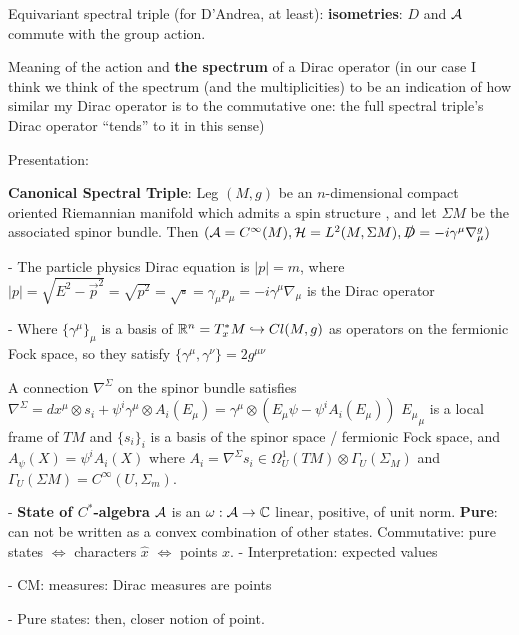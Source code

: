  Equivariant spectral triple (for D'Andrea, at least): \textbf{isometries}: $D$ and $\mathcal A$ commute with the group action.

Meaning of the action and \textbf{the spectrum} of a Dirac operator (in our case I think we think of the spectrum (and the multiplicities) to be an indication of how similar my Dirac operator is to the commutative one: the full spectral triple's Dirac operator ``tends'' to it in this sense)

Presentation:
    
    \textbf{Canonical Spectral Triple}: Leg $(M, g)$ be an $n$-dimensional compact oriented Riemannian manifold which admits a spin structure%
    , and let $\Sigma M$ %
    be the associated spinor bundle. Then $(\mathcal A = C^\infty(M), \mathcal H = L^2(M, \Sigma M), \slashed D = -i \gamma^\mu \nabla^g_\mu)$%
    
        \quad - The particle physics Dirac equation is $|p| = m$, where $|p| = \sqrt{E^2 - \vec p^2} = \sqrt{p^2} = \sqrt{\square} = \gamma_\mu p_\mu = -i \gamma^\mu \nabla_\mu$ is the Dirac operator
        
        \quad - Where $\{\gamma^\mu\}_\mu$ is a basis of $\mathbb{R}^n = T^*_x M \hookrightarrow Cl(M, g)$ as operators on the fermionic Fock space, so they satisfy $\{\gamma^\mu, \gamma^\nu\} = 2 g^{\mu \nu}$
        
        \quad A connection $\nabla^\Sigma$ on the spinor bundle satisfies $\nabla^\Sigma = dx^\mu \otimes s_i + \psi^i \gamma^\mu \otimes A_i(E_\mu) = \gamma^\mu \otimes (E_\mu \psi - \psi^i A_i(E_\mu))$   ${E_\mu}_\mu$ is a local frame of $T M$ and $\{s_i\}_i$ is a basis of the spinor space / fermionic Fock space, and $A_\psi(X) = \psi^i A_i(X)$ where $A_i = \nabla^\Sigma s_i \in \Omega_U^1(TM) \otimes \Gamma_U(\Sigma_M)$ and $\Gamma_U(\Sigma M) = C^\infty(U, \Sigma_m)$.
    
    - \textbf{State of $C^*$-algebra} $\mathcal A$ is an $\omega : \mathcal A \to \mathbb{C}$ linear, positive, of unit norm. \textbf{Pure}: can not be written as a convex combination of other states. Commutative: pure states $\Longleftrightarrow$ characters $\hat x$ $\Longleftrightarrow$ points $x$.
        \quad - Interpretation: expected values
        
        \quad - CM: measures: Dirac measures are points
        
        \quad - Pure states: then, closer notion of point.
        
